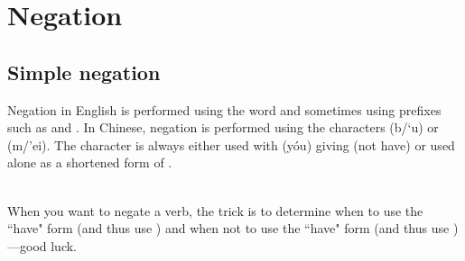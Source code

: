 ﻿%
\chapter{Negation}
\section{Simple negation}
\quad\begin{minipage}{\tw-100mm}%
  Negation in English is performed using the word  and
  sometimes using prefixes such as  and .
  In Chinese, negation is performed using the characters
   (b/`u) or  (m/'ei).
  The character  is always either used with  (y\'ou) giving  (not have)
  or used alone as a shortened form of .
\end{minipage}\quad%
\\[0.5ex]
When you want to negate a verb, the trick is to determine when
to use the ``have" form (and thus use ) and when not to use the
``have" form (and thus use )---good luck.

